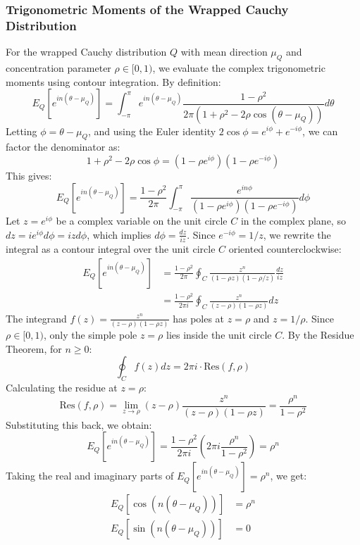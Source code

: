 \documentclass[11pt,a4paper]{article}
\begin{document}
\subsubsection{Trigonometric Moments of the Wrapped Cauchy Distribution}
For the wrapped Cauchy distribution $Q$ with mean direction $\mu_Q$ and concentration parameter $\rho \in [0, 1)$, we evaluate the complex trigonometric moments using contour integration. By definition:
\begin{equation}
E_Q[e^{in(\theta - \mu_Q)}] = \int_{-\pi}^{\pi} e^{in(\theta - \mu_Q)} \frac{1 - \rho^2}{2\pi(1 + \rho^2 - 2\rho\cos(\theta - \mu_Q))} d\theta
\end{equation}
Letting $\phi = \theta - \mu_Q$, and using the Euler identity $2\cos\phi = e^{i\phi} + e^{-i\phi}$, we can factor the denominator as:
\begin{equation}
1 + \rho^2 - 2\rho\cos\phi = (1 - \rho e^{i\phi})(1 - \rho e^{-i\phi})
\end{equation}
This gives:
\begin{equation}
E_Q[e^{in(\theta - \mu_Q)}] = \frac{1 - \rho^2}{2\pi} \int_{-\pi}^{\pi} \frac{e^{in\phi}}{(1 - \rho e^{i\phi})(1 - \rho e^{-i\phi})} d\phi
\end{equation}
Let $z = e^{i\phi}$ be a complex variable on the unit circle $C$ in the complex plane, so $dz = i e^{i\phi} d\phi = i z d\phi$, which implies $d\phi = \frac{dz}{iz}$. Since $e^{-i\phi} = 1/z$, we rewrite the integral as a contour integral over the unit circle $C$ oriented counterclockwise:
\begin{align}
E_Q[e^{in(\theta - \mu_Q)}] &= \frac{1 - \rho^2}{2\pi} \oint_{C} \frac{z^n}{(1 - \rho z)(1 - \rho/z)} \frac{dz}{iz} \nonumber \\
&= \frac{1 - \rho^2}{2\pi i} \oint_{C} \frac{z^n}{(z - \rho)(1 - \rho z)} dz
\end{align}
The integrand $f(z) = \frac{z^n}{(z - \rho)(1 - \rho z)}$ has poles at $z = \rho$ and $z = 1/\rho$. Since $\rho \in [0, 1)$, only the simple pole $z = \rho$ lies inside the unit circle $C$.
By the Residue Theorem, for $n \ge 0$:
\begin{equation}
\oint_{C} f(z) dz = 2\pi i \cdot \text{Res}(f, \rho)
\end{equation}
Calculating the residue at $z = \rho$:
\begin{equation}
\text{Res}(f, \rho) = \lim_{z \to \rho} (z - \rho) \frac{z^n}{(z - \rho)(1 - \rho z)} = \frac{\rho^n}{1 - \rho^2}
\end{equation}
Substituting this back, we obtain:
\begin{equation}
E_Q[e^{in(\theta - \mu_Q)}] = \frac{1 - \rho^2}{2\pi i} \left( 2\pi i \frac{\rho^n}{1 - \rho^2} \right) = \rho^n
\end{equation}
Taking the real and imaginary parts of $E_Q[e^{in(\theta - \mu_Q)}] = \rho^n$, we get:
\begin{align}
E_Q[\cos(n(\theta - \mu_Q))] &= \rho^n \\
E_Q[\sin(n(\theta - \mu_Q))] &= 0
\end{align}
\end{document}
